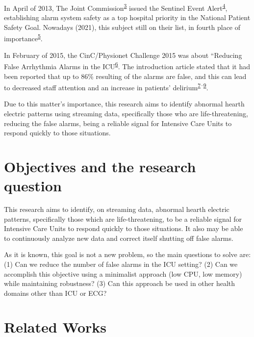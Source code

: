 \documentclass[12pt,twoside]{fmupthesis}
\begin{document}
In April of 2013, The Joint Commission\textsuperscript{\protect\hyperlink{ref-the_jc}{3}} issued the Sentinel Event Alert\textsuperscript{\protect\hyperlink{ref-JointCommission2013}{4}}, establishing
alarm system safety as a top hospital priority in the National Patient Safety Goal. Nowadays (2021), this subject still
on their list, in fourth place of importance\textsuperscript{\protect\hyperlink{ref-the_jc2021}{5}}.

In February of 2015, the CinC/Physionet Challenge 2015 was about ``Reducing False Arrhythmia Alarms in the
ICU\textsuperscript{\protect\hyperlink{ref-Clifford2015}{6}}. The introduction article stated that it had been reported that up to 86\% resulting of the alarms are
false, and this can lead to decreased staff attention and an increase in patients' delirium\textsuperscript{\protect\hyperlink{ref-Lawless1994}{7}--\protect\hyperlink{ref-Parthasarathy2004}{9}}.

Due to this matter's importance, this research aims to identify abnormal hearth electric patterns using streaming data,
specifically those who are life-threatening, reducing the false alarms, being a reliable signal for Intensive Care Units
to respond quickly to those situations.

\hypertarget{objectives-and-the-research-question}{%
\chapter{Objectives and the research question}\label{objectives-and-the-research-question}}

This research aims to identify, on streaming data, abnormal hearth electric patterns, specifically those which are
life-threatening, to be a reliable signal for Intensive Care Units to respond quickly to those situations. It also may
be able to continuously analyze new data and correct itself shutting off false alarms.

As it is known, this goal is not a new problem, so the main questions to solve are: (1) Can we reduce the number of
false alarms in the ICU setting? (2) Can we accomplish this objective using a minimalist approach (low CPU, low memory)
while maintaining robustness? (3) Can this approach be used in other health domains other than ICU or ECG?

\hypertarget{related-works}{%
\chapter{Related Works}\label{related-works}}
\end{document}
